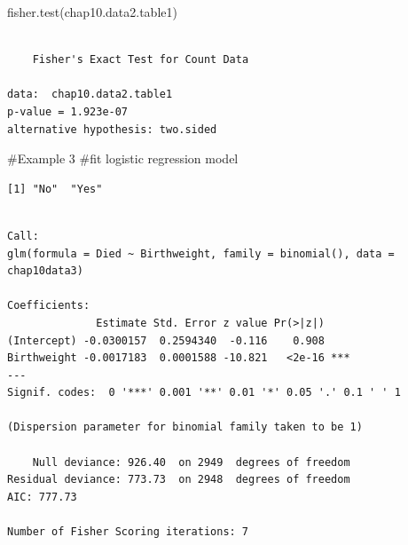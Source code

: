 \documentclass[
  letterpaper,
  DIV=11,
  numbers=noendperiod]{scrartcl}
\newenvironment{Shaded}{\begin{snugshade}}{\end{snugshade}}
\newcommand{\AttributeTok}[1]{\textcolor[rgb]{0.40,0.45,0.13}{#1}}
\newcommand{\DecValTok}[1]{\textcolor[rgb]{0.68,0.00,0.00}{#1}}
\newcommand{\FunctionTok}[1]{\textcolor[rgb]{0.28,0.35,0.67}{#1}}
\newcommand{\NormalTok}[1]{\textcolor[rgb]{0.00,0.23,0.31}{#1}}
\newcommand{\OtherTok}[1]{\textcolor[rgb]{0.00,0.23,0.31}{#1}}
\newcommand{\SpecialCharTok}[1]{\textcolor[rgb]{0.37,0.37,0.37}{#1}}
\newcommand{\StringTok}[1]{\textcolor[rgb]{0.13,0.47,0.30}{#1}}
\begin{document}
\begin{Shaded}
\begin{Highlighting}[]
\FunctionTok{fisher.test}\NormalTok{(chap10.data2.table1)}
\end{Highlighting}
\end{Shaded}

\begin{verbatim}

    Fisher's Exact Test for Count Data

data:  chap10.data2.table1
p-value = 1.923e-07
alternative hypothesis: two.sided
\end{verbatim}

\#Example 3 \#fit logistic regression model

\begin{Shaded}
\end{Shaded}

\begin{verbatim}
[1] "No"  "Yes"
\end{verbatim}

\begin{Shaded}
\end{Shaded}

\begin{verbatim}

Call:
glm(formula = Died ~ Birthweight, family = binomial(), data = chap10data3)

Coefficients:
              Estimate Std. Error z value Pr(>|z|)    
(Intercept) -0.0300157  0.2594340  -0.116    0.908    
Birthweight -0.0017183  0.0001588 -10.821   <2e-16 ***
---
Signif. codes:  0 '***' 0.001 '**' 0.01 '*' 0.05 '.' 0.1 ' ' 1

(Dispersion parameter for binomial family taken to be 1)

    Null deviance: 926.40  on 2949  degrees of freedom
Residual deviance: 773.73  on 2948  degrees of freedom
AIC: 777.73

Number of Fisher Scoring iterations: 7
\end{verbatim}
\end{document}
